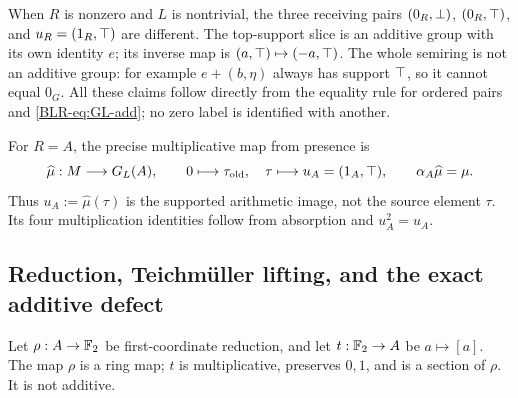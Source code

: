 When $R$ is nonzero and $L$ is nontrivial, the three receiving pairs
$(0_R,\bot)$, $(0_R,\top)$, and $u_R=(1_R,\top)$ are different.
The top-support slice is an additive group with its own identity $e$;
its inverse map is $(a,\top)\mapsto(-a,\top)$.
The whole semiring is not an additive group: for example
$e+(b,\eta)$ always has support $\top$, so it cannot equal $0_G$.
All these claims follow directly from the equality rule for ordered
pairs and \eqref{BLR-eq:GL-add}; no zero label is identified with another.

For $R=A$, the precise multiplicative map from presence is
\[
 \widehat\mu:M\longrightarrow G_L(A),\qquad
 0\longmapsto\tau_{\mathrm{old}},\quad
 \tau\longmapsto u_A=(1_A,\top),
 \qquad \alpha_A\widehat\mu=\mu.
\]
Thus $u_A:=\widehat\mu(\tau)$ is the supported arithmetic image,
not the source element $\tau$. Its four multiplication identities
follow from absorption and $u_A^2=u_A$.

\subsection{Reduction, Teichm\"uller lifting, and the exact additive defect}
Let $\rho:A\to\mathbb F_2$ be first-coordinate reduction, and let
$t:\mathbb F_2\to A$ be $a\mapsto[a]$. The map $\rho$ is a ring map;
$t$ is multiplicative, preserves $0,1$, and is a section of $\rho$.
It is not additive.

